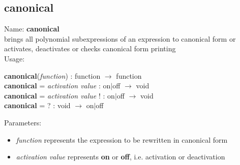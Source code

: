 \subsection{canonical}
\label{labcanonical}
\noindent Name: \textbf{canonical}\\
brings all polynomial subexpressions of an expression to canonical form or activates, deactivates or checks canonical form printing\\

\noindent Usage: 
\begin{center}
\textbf{canonical}(\emph{function}) : \textsf{function} $\rightarrow$ \textsf{function}\\
\textbf{canonical} = \emph{activation value} : \textsf{on$|$off} $\rightarrow$ \textsf{void}\\
\textbf{canonical} = \emph{activation value} ! : \textsf{on$|$off} $\rightarrow$ \textsf{void}\\
\textbf{canonical} = ? : \textsf{void} $\rightarrow$ \textsf{on$|$off}\\
\end{center}
Parameters: 
\begin{itemize}
\item \emph{function} represents the expression to be rewritten in canonical form
\item \emph{activation value} represents \textbf{on} or \textbf{off}, i.e. activation or deactivation
\end{itemize}

